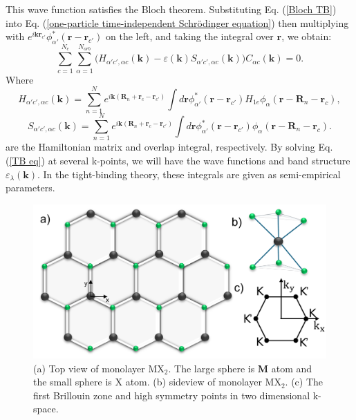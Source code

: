 \documentclass[12pt,english,a4paper]{article}
\begin{document}
	\quad This wave function satisfies the Bloch theorem. Substituting Eq. (\ref{Bloch TB}) into Eq. (\ref{one-particle time-independent Schrödinger equation}) then 
	multiplying with $e^{i\textbf{k}\textbf{r}_{c'}} \phi_{\alpha'}^* (\textbf{r}-\textbf{r}_{c'})$ on the left, and taking the integral over $\textbf{r}$, we obtain:
	\begin{equation}
		\label{TB eq}
	\sum_{c=1}^{N_c} \sum_{\alpha = 1}^{N_{orb}}\big(H_{\alpha'c',\alpha c}(\textbf{k}) - \varepsilon(\textbf{k})S_{\alpha'c',\alpha c}(\textbf{k})\big) C_{\alpha c}(\textbf{k}) =0.
	\end{equation}
	Where
	\begin{equation}
		H_{\alpha'c',\alpha c}(\textbf{k}) = \sum_{n=1}^N e^{i\textbf{k}(\textbf{R}_n +\textbf{r}_c -\textbf{r}_{c'})} \int d\textbf{r} \phi^*_{\alpha'}(\textbf{r}-\textbf{r}_{c'}) H_{1e} \phi_{\alpha}(\textbf{r}-\textbf{R}_n -\textbf{r}_c),
		\label{hopping energies}
	\end{equation}
	\begin{equation}
		S_{\alpha'c',\alpha c}(\textbf{k}) = \sum_{n=1}^N e^{i\textbf{k}(\textbf{R}_n +\textbf{r}_c -\textbf{r}_{c'})} \int d\textbf{r} \phi^*_{\alpha'}(\textbf{r}-\textbf{r}_{c'}) \phi_{\alpha}(\textbf{r}-\textbf{R}_n -\textbf{r}_c).
	\end{equation}
	\quad are the Hamiltonian matrix and overlap integral, respectively. By solving Eq. (\ref{TB eq}) at several k-points, we will have the wave functions and band structure $\varepsilon_\lambda(\textbf{k})$. In the tight-binding theory, these integrals are given as semi-empirical parameters.
	\begin{figure}
		\begin{center}
			\includegraphics[width=0.75\linewidth]{Images/RS.pdf}
			\caption[TMD structure and its first Brillouin zone]{(a) Top view of monolayer $\mathrm{MX}_2$. The large sphere is \textbf{M} atom and the small sphere is X atom. (b) sideview of monolayer $\mathrm{MX}_2$. (c) The first Brillouin zone and high symmetry points in two dimensional k-space.}
			\label{real space}
		\end{center}
	\end{figure}
\end{document}
